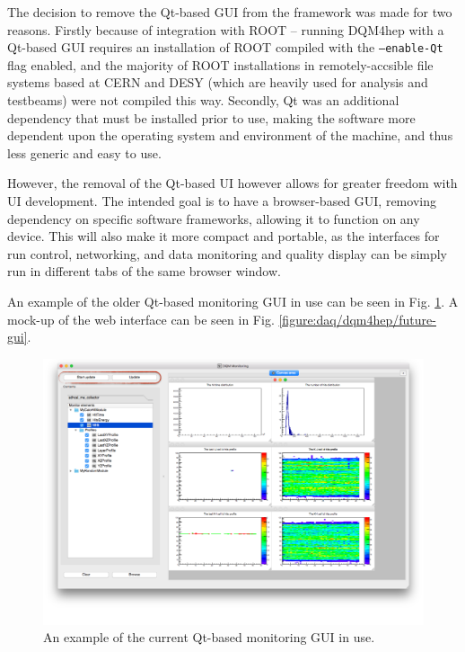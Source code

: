 The decision to remove the Qt-based GUI from the framework was made for two reasons. Firstly because of integration with ROOT -- running DQM4hep with a Qt-based GUI requires an installation of ROOT compiled with the \texttt{--enable-Qt} flag enabled, and the majority of ROOT installations in remotely-accsible file systems based at CERN and DESY (which are heavily used for analysis and testbeams) were not compiled this way. Secondly, Qt was an additional dependency that must be installed prior to use, making the software more dependent upon the operating system and environment of the machine, and thus less generic and easy to use.

However, the removal of the Qt-based UI however allows for greater freedom with UI development. The intended goal is to have a browser-based GUI, removing dependency on specific software frameworks, allowing it to function on any device. This will also make it more compact and portable, as the interfaces for run control, networking, and data monitoring and quality display can be simply run in different tabs of the same browser window.

An example of the older Qt-based monitoring GUI in use can  be seen in Fig. \ref{figure:daq/dqm4hep/old-gui}. A mock-up of the web interface can be seen in Fig. \ref{figure:daq/dqm4hep/future-gui}.

\begin{figure}
	\centering
	\includegraphics[width=1.0\textwidth]{../Pictures/DQM4hepMonitoringGui.png}
	\caption{An example of the current Qt-based monitoring GUI in use.}
	\label{figure:daq/dqm4hep/old-gui}
\end{figure}

